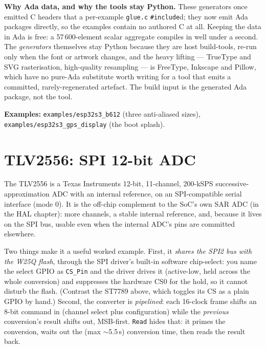 \noindent\textbf{Why Ada data, and why the tools stay Python.} These generators
once emitted C headers that a per-example \texttt{glue.c} \texttt{\#include}d; they
now emit Ada packages directly, so the examples contain no authored C at all.
Keeping the data in Ada is free: a 57\,600-element scalar aggregate compiles in
well under a second. The \emph{generators} themselves stay Python because they are
host build-tools, re-run only when the font or artwork changes, and the heavy
lifting --- TrueType and SVG rasterisation, high-quality resampling --- is
FreeType, Inkscape and Pillow, which have no pure-Ada substitute worth writing for
a tool that emits a committed, rarely-regenerated artefact. The build input is the
generated Ada package, not the tool.

\noindent\textbf{Examples:} \texttt{examples/esp32s3\_b612} (three anti-aliased
sizes), \texttt{examples/esp32s3\_gps\_display} (the boot splash).

\section{TLV2556: SPI 12-bit ADC}
\label{app:ext:tlv2556}

The TLV2556 is a Texas Instruments 12-bit, 11-channel, 200-kSPS
successive-approximation ADC with an internal reference, on an SPI-compatible
serial interface (mode 0). It is the off-chip complement to the SoC's own SAR ADC
(in the HAL chapter): more channels, a stable internal reference, and, because
it lives on the SPI bus, usable even when the internal ADC's pins are committed
elsewhere.

Two things make it a useful worked example. First, it \emph{shares the SPI2 bus
with the W25Q flash}, through the SPI driver's built-in software chip-select: you
name the select GPIO as \texttt{CS\_Pin} and the driver drives it (active-low,
held across the whole conversion) and suppresses the hardware CS0 for the hold,
so it cannot disturb the flash. (Contrast the ST7789 above, which toggles its CS
as a plain GPIO by hand.) Second, the converter is \emph{pipelined}: each 16-clock
frame shifts an 8-bit command in (channel select plus configuration) while the
\emph{previous} conversion's result shifts out, MSB-first. \texttt{Read} hides
that: it primes the conversion, waits out the (max $\sim$5.5\,\textmu s)
conversion time, then reads the result back.

